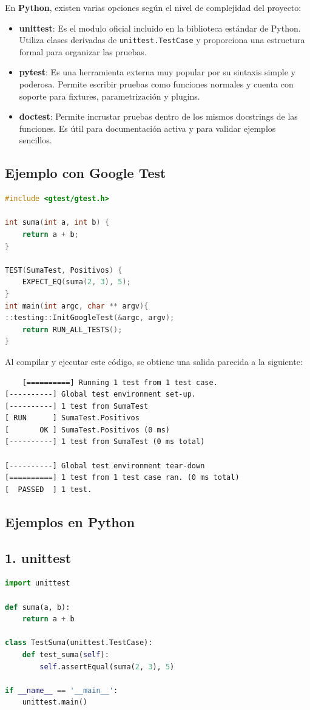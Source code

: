 \documentclass[12pt]{article}
\begin{document}
En \textbf{Python}, existen varias opciones según el nivel de complejidad del proyecto:
\begin{itemize}
    \item \textbf{unittest}: Es el modulo oficial incluido en la biblioteca estándar de Python. Utiliza clases derivadas de \texttt{unittest.TestCase} y proporciona una estructura formal para organizar las pruebas.
    \item\textbf{pytest}: Es una herramienta externa muy popular por su sintaxis simple y poderosa. Permite escribir pruebas como funciones normales y cuenta con soporte para fixtures, parametrización y plugins. 
    \item\textbf{doctest}: Permite incrustar pruebas dentro de los mismos docstrings de las funciones. Es útil para documentación activa y para validar ejemplos sencillos.
\end{itemize}
\subsection*{Ejemplo con Google Test}
\begin{lstlisting}[language=C++]
#include <gtest/gtest.h>

int suma(int a, int b) {
    return a + b;
}

TEST(SumaTest, Positivos) {
    EXPECT_EQ(suma(2, 3), 5);
}
int main(int argc, char ** argv){
::testing::InitGoogleTest(&argc, argv);
    return RUN_ALL_TESTS();
}
\end{lstlisting}

Al compilar y ejecutar este código, se obtiene una salida parecida a la siguiente:
\begin{lstlisting}
    [==========] Running 1 test from 1 test case.
[----------] Global test environment set-up.
[----------] 1 test from SumaTest
[ RUN      ] SumaTest.Positivos
[       OK ] SumaTest.Positivos (0 ms)
[----------] 1 test from SumaTest (0 ms total)

[----------] Global test environment tear-down
[==========] 1 test from 1 test case ran. (0 ms total)
[  PASSED  ] 1 test.
\end{lstlisting}

\subsection*{Ejemplos en Python} 
\subsection*{1. unittest} 
\begin{lstlisting}[language=Python] 
import unittest

def suma(a, b):
    return a + b

class TestSuma(unittest.TestCase):
    def test_suma(self):
        self.assertEqual(suma(2, 3), 5)

if __name__ == '__main__':
    unittest.main()
\end{lstlisting}
\end{document}
